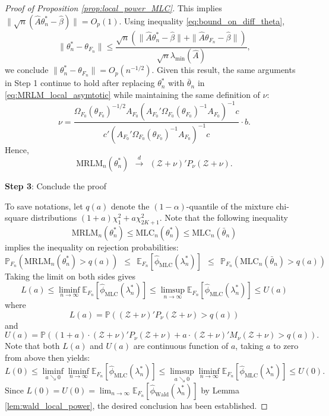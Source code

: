 \documentclass[11pt]{article}
\theoremstyle{definition}
\newcommand{\Exp}{\ensuremath{\mathbb{E}}} %
\newcommand{\Prob}{\ensuremath{\mathbb{P}}} %
\newcommand{\0}{\ensuremath{\mathbf{0}}}
\begin{document}
\begin{bibunit}
\begin{proof}[Proof of Proposition \ref{prop:local_power_MLC}]
    This implies $\|\sqrt{n}(\hat{A}\theta_n^* - \hat{\beta})\| = O_p(1)$. Using inequality \eqref{eq:bound_on_diff_theta}, 
    \[  
        \|\theta_n^* - \theta_{F_n}\| \leq 
        \frac{\sqrt{n}(\|\hat{A}\theta_n^* - \hat{\beta}\| + \|\hat{A}\theta_{F_n} - \hat{\beta}\|)}{\sqrt{n}\lambda_{\min}(\hat{A})},
    \]
    we conclude $\|\theta_n^* - \theta_{F_n}\| = O_p(n^{-1/2})$. Given this result, the same arguments in Step 1 continue to hold after replacing $\theta_n^*$ with $\bar{\theta}_n$ in \eqref{eq:MRLM_local_asymtotic} while maintaining the same definition of $\nu$:
    \[
        \nu = \frac{\Omega_{F_0}(\theta_{F_0})^{-1/2}{A}_{F_0}(A_{F_0}'\Omega_{F_0}(\theta_{F_0})^{-1} A_{F_0})^{-1} c}{c'(A_{F_0}'\Omega_{F_0}(\theta_{F_0})^{-1} A_{F_0})^{-1} c} \cdot b.
    \] 
    Hence,
    \[
        \text{MRLM}_n(\theta_n^*) ~~\xrightarrow{d}~~ (\mathcal{Z}+ \nu)'P_\nu(\mathcal{Z} + \nu).
    \]
    
    \medskip
    \textbf{Step 3}: Conclude the proof \par
    \medskip
    To save notations, let $q(a)$ denote the $(1-\alpha)$-quantile of the mixture chi-square distributions $(1+a)\chi_1^2 + a\chi_{2K+1}^2$. 
    Note that the following inequality 
    \[
        \text{MRLM}_n(\theta_n^*) \leq \text{MLC}_n(\theta_n^*) \leq \text{MLC}_n(\bar{\theta}_n)
    \]
    implies the inequality on rejection probabilities:
    \[
        \Prob_{F_n}(\text{MRLM}_n(\theta_n^*) > q(a)) 
        ~~\leq~~ \Exp_{F_n}[\hat{\phi}_{\text{MLC}}(\lambda_n^*)] 
        ~~\leq~~ \Prob_{F_n}(\text{MLC}_n(\bar{\theta}_n) > q(a))
    \]
    Taking the limit on both sides gives
    \[
        L(a) \leq \liminf_{n\to\infty}\Exp_{F_n}[\hat{\phi}_{\text{MLC}}(\lambda_n^*)] \leq \limsup_{n\to\infty}\Exp_{F_n}[\hat{\phi}_{\text{MLC}}(\lambda_n^*)] \leq U(a)
    \]
    where 
    \[
        L(a) = \Prob((\mathcal{Z} + \nu)'P_\nu(\mathcal{Z} + \nu) > q(a))
    \]
    and
    \[
        U(a) = \Prob((1+a)\cdot (\mathcal{Z} + \nu)'P_\nu (\mathcal{Z} + \nu) + a\cdot(\mathcal{Z} + \nu)'M_{\nu}(\mathcal{Z} + \nu) > q(a)).
    \]
    Note that both $L(a)$ and $U(a)$ are continuous function of $a$, taking $a$ to zero from above then yields:
    \[
        L(0) \leq \liminf_{a\searrow 0} \liminf_{n\to\infty} \Exp_{F_n}[\hat{\phi}_{\text{MLC}}(\lambda_n^*)] \leq  \limsup_{a\searrow 0} \liminf_{n\to\infty} \Exp_{F_n}[\hat{\phi}_{\text{MLC}}(\lambda_n^*)] \leq U(0).
    \]
    Since $L(0) = U(0) = \lim_{n\to\infty} \Exp_{F_n}[\hat{\phi}_{\text{Wald}}(\lambda_n^*)]$ by Lemma \ref{lem:wald_local_power}, the desired conclusion has been established.
\end{proof}




\end{bibunit}
\end{document}

